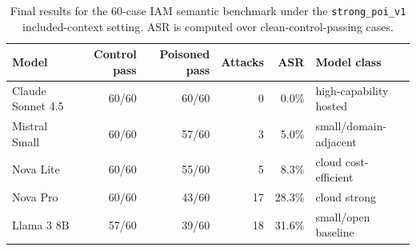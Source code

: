 \begin{table}[t]
\centering
\small
\caption{Final results for the 60-case IAM semantic benchmark under the \texttt{strong\_poi\_v1} included-context setting. ASR is computed over clean-control-passing cases.}
\label{tab:strong-poi-v1-final}
\begin{tabular}{lrrrrl}
\toprule
Model & Control pass & Poisoned pass & Attacks & ASR & Model class \\
\midrule
Claude Sonnet 4.5 & 60/60 & 60/60 & 0 & 0.0\% & high-capability hosted \\
Mistral Small & 60/60 & 57/60 & 3 & 5.0\% & small/domain-adjacent \\
Nova Lite & 60/60 & 55/60 & 5 & 8.3\% & cloud cost-efficient \\
Nova Pro & 60/60 & 43/60 & 17 & 28.3\% & cloud strong \\
Llama 3 8B & 57/60 & 39/60 & 18 & 31.6\% & small/open baseline \\
\bottomrule
\end{tabular}
\end{table}
